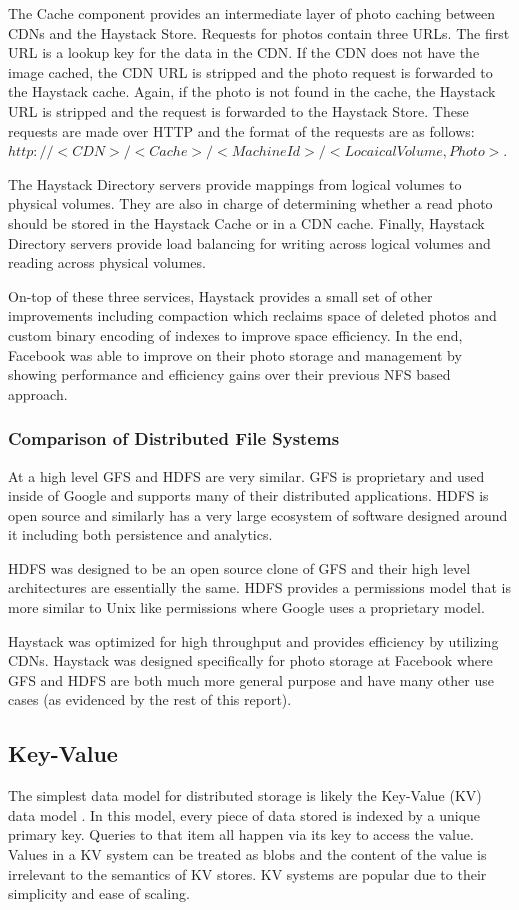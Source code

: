 \documentclass[]{article}
\begin{document}
The Cache component provides an intermediate layer of photo caching between CDNs and the Haystack Store. Requests for photos contain three URLs. The first URL is a lookup key for the data in the CDN. If the CDN does not have the image cached, the CDN URL is stripped and the photo request is forwarded to the Haystack cache. Again, if the photo is not found in the cache, the Haystack URL is stripped and the request is forwarded to the Haystack Store. These requests are made over HTTP and the format of the requests are as follows: $http://<CDN>/<Cache>/<Machine Id>/<Locaical Volume, Photo>$.

The Haystack Directory servers provide mappings from logical volumes to physical volumes. They are also in charge of determining whether a read photo should be stored in the Haystack Cache or in a CDN cache. Finally, Haystack Directory servers provide load balancing for writing across logical volumes and reading across physical volumes.

On-top of these three services, Haystack provides a small set of other improvements including compaction which reclaims space of deleted photos and custom binary encoding of indexes to improve space efficiency. In the end, Facebook was able to improve on their photo storage and management by showing performance and efficiency gains over their previous NFS based approach.

\subsubsection{Comparison of Distributed File Systems}
At a high level GFS and HDFS are very similar\cite{khalidcomparison}. GFS is proprietary and used inside of Google and supports many of their distributed applications. HDFS is open source and similarly has a very large ecosystem of software designed around it including both persistence and analytics. 

HDFS was  designed to be an open source clone of GFS and their high level architectures are essentially the same. HDFS provides a permissions model that is more similar to Unix like permissions where Google uses a proprietary model.

Haystack was optimized for high throughput and provides efficiency by utilizing CDNs. Haystack was designed specifically for photo storage at Facebook where GFS and HDFS are both much more general purpose and have many other use cases (as evidenced by the rest of this report).

\subsection{Key-Value}\label{ssec:key-value}
The simplest data model for distributed storage is likely the Key-Value (KV) data model \cite{weber_nosql_2010}. In this model, every piece of data stored is indexed by a unique primary key. Queries to that item all happen via its key to access the value. Values in a KV system can be treated as blobs and the content of the value is irrelevant to the semantics of KV stores. KV systems are popular due to their simplicity and ease of scaling.
\end{document}

